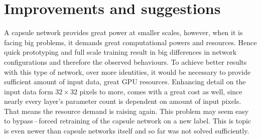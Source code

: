 \section{Improvements and suggestions}

A capsule network provides great power at smaller scales, however, when it is facing big problems, it demands great computational powers and resources. Hence quick prototyping and full scale training result in big differences in network configurations and therefore the observed behaviours. To achieve better results with this type of network, over more identities, it would be necessary to provide sufficient amount of input data, great GPU resources. Enhancing detail on the input data form $32\times32$ pixels to more, comes with a great cost as well, since nearly every layer's parameter count is dependent on amount of input pixels. That means the resource demand is raising again. This problem may seem easy to bypass\,--\,forced retraining of the capsule network on a new label. This is topic is even newer than capsule networks itself and so far was not solved sufficiently.
